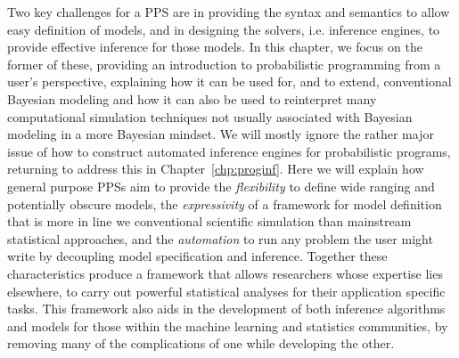 Two key challenges for a PPS are in providing the
syntax and semantics to allow easy definition of models, and in designing the solvers, i.e.
inference engines, to provide effective inference for those models.
In this chapter, we focus on the former of these, providing an introduction to 
probabilistic programming from a user's perspective, explaining how it can be used for, and
to extend, conventional Bayesian modeling and how it can also be used to reinterpret many computational simulation
techniques not usually associated with Bayesian modeling in a more Bayesian mindset.
We will mostly ignore the rather major issue of how to construct automated inference engines for probabilistic
programs, returning to address this in Chapter~\ref{chp:proginf}.
Here we will explain how general purpose PPSs aim to  provide 
the \emph{flexibility} to define
wide ranging and potentially obscure models, the \emph{expressivity} of a framework for 
model definition that is more in line we conventional scientific simulation than mainstream 
statistical approaches, and the \emph{automation} to  run any problem the user might write
by decoupling model specification and inference.
Together these characteristics produce a framework that allows researchers whose expertise 
lies elsewhere, to carry out powerful statistical analyses for their application specific tasks.  
This framework also aids in the development of both inference
algorithms and models for those within the machine learning and statistics communities,
by removing many of the complications of one while developing the other.
%

